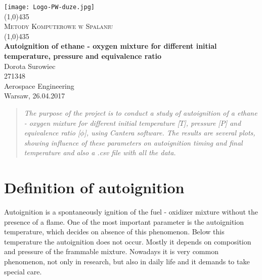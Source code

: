 \documentclass[11pt]{article}
\begin{document}
\begin{titlepage}

	\begin{center}
    \texttt{[image: Logo-PW-duze.jpg]} \\
    [10mm]
	\line(1,0){435} \\
	[7mm]
	\huge{\textsc{Metody Komputerowe w Spalaniu}} \\
	\line(1,0){435} \\
	[15mm]
    \LARGE{\textbf{Autoignition of ethane - oxygen mixture for different initial temperature, pressure and equivalence ratio}} \\
	[50mm]
	\Large{Dorota Surowiec}\\
    \Large{271348}\\
    [25mm]
    \large{Aerospace Engineering}\\
    [3mm]
    \large{Warsaw, 26.04.2017}\\
    \end{center}
    
\end{titlepage}

\newpage

\begin{abstract}

\textit{The purpose of the project is to conduct a study of autoignition of a ethane - oxygen mixture for different initial temperature [$T$], pressure [$P$] and equivalence ratio [$\phi$], using Cantera software. The results are several plots, showing influence of these parameters on autoignition timing and final temperature and also a .csv file with all the data.}

\end{abstract}

\section{Definition of autoignition}
Autoignition is a spontaneously ignition of the fuel - oxidizer mixture without the presence of a flame. One of the most important parameter is the autoignition temperature, which decides on absence of this phenomenon. Below this temperature the autoignition does not occur. Mostly it depends on composition and pressure of the frammable mixture. Nowadays it is very common phenomenon, not only in research, but also in daily life and it demands to take special care.
\end{document}
